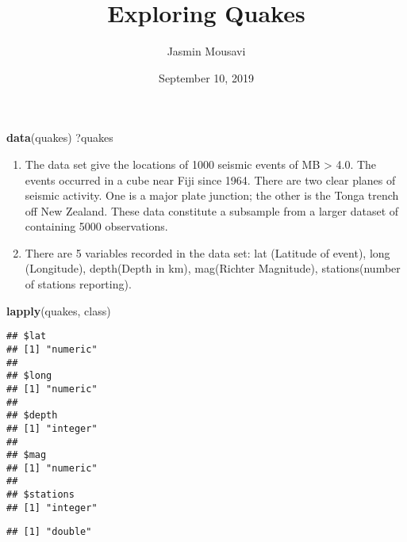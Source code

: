 \documentclass[]{article}
\title{Exploring Quakes}
\author{Jasmin Mousavi}
\date{September 10, 2019}
\newenvironment{Shaded}{\begin{snugshade}}{\end{snugshade}}
\newcommand{\KeywordTok}[1]{\textcolor[rgb]{0.13,0.29,0.53}{\textbf{#1}}}
\newcommand{\NormalTok}[1]{#1}
\newcommand{\OperatorTok}[1]{\textcolor[rgb]{0.81,0.36,0.00}{\textbf{#1}}}
\begin{document}
\maketitle

\begin{Shaded}
\begin{Highlighting}[]
\KeywordTok{data}\NormalTok{(quakes)}
\NormalTok{?quakes}
\end{Highlighting}
\end{Shaded}

\begin{enumerate}
\def\labelenumi{\arabic{enumi}.}
\item
  The data set give the locations of 1000 seismic events of MB
  \textgreater{} 4.0. The events occurred in a cube near Fiji since
  1964. There are two clear planes of seismic activity. One is a major
  plate junction; the other is the Tonga trench off New Zealand. These
  data constitute a subsample from a larger dataset of containing 5000
  observations.
\item
  There are 5 variables recorded in the data set: lat (Latitude of
  event), long (Longitude), depth(Depth in km), mag(Richter Magnitude),
  stations(number of stations reporting).
\end{enumerate}

\begin{Shaded}
\begin{Highlighting}[]
\KeywordTok{lapply}\NormalTok{(quakes, class)}
\end{Highlighting}
\end{Shaded}

\begin{verbatim}
## $lat
## [1] "numeric"
## 
## $long
## [1] "numeric"
## 
## $depth
## [1] "integer"
## 
## $mag
## [1] "numeric"
## 
## $stations
## [1] "integer"
\end{verbatim}

\begin{Shaded}
\end{Shaded}

\begin{verbatim}
## [1] "double"
\end{verbatim}

\begin{Shaded}
\end{Shaded}
\end{document}
